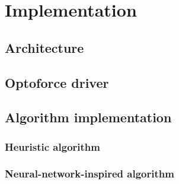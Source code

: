 \documentclass[buriama8_dp.tex]{subfiles}
\begin{document}
\chapter{Implementation}

\section{Architecture}
\label{sec:impl_arch}


\section{Optoforce driver}
\label{sec:opto_driver}


\section{Algorithm implementation}
\label{sec:alg_impl}

\subsection{Heuristic algorithm}
\label{subsec:impl_heur}

\subsection{Neural-network-inspired algorithm}
\label{subsec:impl_neuro}
\end{document}
